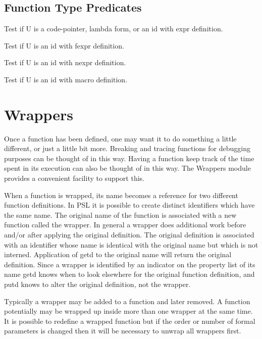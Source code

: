 \subsection{Function Type Predicates}

{    Test if U is a code-pointer, lambda form, or an id with expr
    definition.
}

{    Test if U is an id with fexpr definition.
}

{    Test if U is an id with nexpr definition.
}

{    Test if U is an id with macro definition.
}

\section{Wrappers}

  Once  a  function  has  been  defined,  one  may want it to do
something a  little  different,  or  just  a  little  bit  more.
Breaking  and  tracing  functions  for debugging purposes can be
thought of in this way.  Having a function  keep  track  of  the
time  spent in its execution can also be thought of in this way.
The Wrappers module provides a convenient  facility  to  support
this.

  When  a  function is wrapped, its name becomes a reference for
two different function definitions.  In PSL it  is  possible  to
create  distinct  identifiers  which  have  the  same name.  The
original name of the function is associated with a new  function
called  the  wrapper.  In general a wrapper does additional work
before and/or after  applying  the  original  definition.    The
original  definition is associated with an identifier whose name
is identical with the original name but which is  not  interned.
Application  of  getd  to  the  original  name  will  return the
original  definition.  Since  a  wrapper  is  identified  by  an
indicator  on  the  property list of its name getd knows when to
look elsewhere for the original function  definition,  and  putd
knows to alter the original definition, not the wrapper.

  Typically  a  wrapper  may  be  added  to a function and later
removed.  A function potentially may be wrapped up  inside  more
than one wrapper at the same time.  It is possible to redefine a
wrapped function but if the order or number of formal parameters
is  changed  then  it  will  be necessary to unwrap all wrappers
first.

